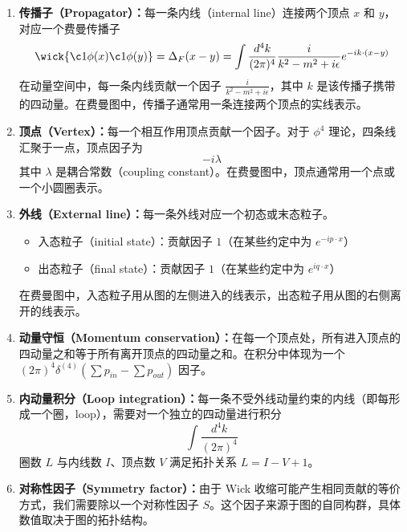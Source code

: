 \begin{enumerate}
    \item \textbf{传播子（Propagator）：}每一条内线（internal line）连接两个顶点 $x$ 和 $y$，对应一个费曼传播子
    \begin{equation}
        \wick{\c1 \phi(x) \c1 \phi(y)} = \Delta_F(x - y) = \int \frac{d^4 k}{(2\pi)^4} \frac{i}{k^2 - m^2 + i\epsilon} e^{-ik\cdot(x - y)}
    \end{equation}
    在动量空间中，每一条内线贡献一个因子 $\displaystyle \frac{i}{k^2 - m^2 + i\epsilon}$，其中 $k$ 是该传播子携带的四动量。在费曼图中，传播子通常用一条连接两个顶点的实线表示。

    \item \textbf{顶点（Vertex）：}每一个相互作用顶点贡献一个因子。对于 $\phi^4$ 理论，四条线汇聚于一点，顶点因子为
    \begin{equation}
        -i\lambda
    \end{equation}
    其中 $\lambda$ 是耦合常数（coupling constant）。在费曼图中，顶点通常用一个点或一个小圆圈表示。

    \item \textbf{外线（External line）：}每一条外线对应一个初态或末态粒子。
    \begin{itemize}
        \item 入态粒子（initial state）：贡献因子 $1$（在某些约定中为 $e^{-ip\cdot x}$）
        \item 出态粒子（final state）：贡献因子 $1$（在某些约定中为 $e^{iq\cdot x}$）
    \end{itemize}
    在费曼图中，入态粒子用从图的左侧进入的线表示，出态粒子用从图的右侧离开的线表示。

    \item \textbf{动量守恒（Momentum conservation）：}在每一个顶点处，所有进入顶点的四动量之和等于所有离开顶点的四动量之和。在积分中体现为一个 $(2\pi)^4\delta^{(4)}(\sum p_{in} - \sum p_{out})$ 因子。

    \item \textbf{内动量积分（Loop integration）：}每一条不受外线动量约束的内线（即每形成一个圈，loop），需要对一个独立的四动量进行积分
    \begin{equation}
        \int \frac{d^4 k}{(2\pi)^4}
    \end{equation}
    圈数 $L$ 与内线数 $I$、顶点数 $V$ 满足拓扑关系 $L = I - V + 1$。

    \item \textbf{对称性因子（Symmetry factor）：}由于 Wick 收缩可能产生相同贡献的等价方式，我们需要除以一个对称性因子 $S$。这个因子来源于图的自同构群，具体数值取决于图的拓扑结构。
\end{enumerate}

